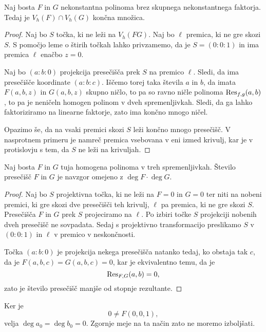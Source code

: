 \begin{trditev}
Naj bosta $F$ in $G$ nekonstantna polinoma brez skupnega
nekonstantnega faktorja. Tedaj je $V_h(F) \cap V_h(G)$ končna
množica.
\end{trditev}

\begin{proof}
Naj bo $S$ točka, ki ne leži na $V_h(FG)$. Naj bo $\ell$ premica,
ki ne gre skozi $S$. S pomočjo leme o štirih točkah lahko
privzamemo, da je $S = (0 : 0 : 1)$ in ima premica $\ell$ enačbo
$z = 0$.

Naj bo $(a : b : 0)$ projekcija presečišča prek $S$ na premico
$\ell$. Sledi, da ima presečišče koordinate $(a : b : c)$. Iščemo
torej taka števila $a$ in $b$, da imata $F(a, b, z)$ in
$G(a, b, z)$ skupno ničlo, to pa so ravno ničle polinoma
$\operatorname{Res}_{f,g}(a,b)$, to pa je neničeln homogen polinom v dveh
spremenljivkah. Sledi, da ga lahko faktoriziramo na linearne
faktorje, zato ima končno mnogo ničel.

Opazimo še, da na vsaki premici skozi $S$ leži končno mnogo
presečišč. V nasprotnem primeru je namreč premica vsebovana v eni
izmed krivulj, kar je v protislovju s tem, da $S$ ne leži na
krivuljah. 
\end{proof}


\begin{trditev}
Naj bosta $F$ in $G$ tuja homogena polinoma v treh spremenljivkah.
Število presečišč $F$ in $G$ je navzgor omejeno z
$\deg F \cdot \deg G$.
\end{trditev}

\begin{proof}
Naj bo $S$ projektivna točka, ki ne leži na $F = 0$ in $G = 0$ ter
niti na nobeni premici, ki gre skozi dve presečišči teh krivulj,
$\ell$ pa premica, ki ne gre skozi $S$. Presečišča $F$ in $G$ prek
$S$ projeciramo na $\ell$. Po izbiri točke $S$ projekciji nobenih
dveh presečišč ne sovpadata. Sedaj s projektivno transformacijo
preslikamo $S$ v $(0 : 0 : 1)$ in $\ell$ v premico v neskončnosti.

Točka $(a : b : 0)$ je projekcija nekega presečišča natanko tedaj,
ko obstaja tak $c$, da je $F(a, b, c) = G(a, b, c) = 0$, kar je
ekvivalentno temu, da je
\[
\operatorname{Res}_{F,G}(a, b) = 0,
\]
zato je število presečišč manjše od stopnje rezultante. 
\end{proof}

\begin{opomba}
Ker je
\[
0 \ne F(0, 0, 1),
\]
velja $\deg a_0 = \deg b_0 = 0$. Zgornje meje na ta način zato ne
moremo izboljšati.
\end{opomba}

